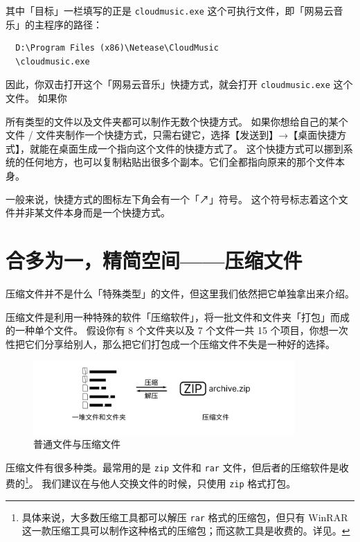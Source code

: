 其中「目标」一栏填写的正是 \verb|cloudmusic.exe| 这个可执行文件，即「网易云音乐」的主程序的路径：

\begin{verbatim}
  D:\Program Files (x86)\Netease\CloudMusic
  \cloudmusic.exe
\end{verbatim}

因此，你双击打开这个「网易云音乐」快捷方式，就会打开 \verb|cloudmusic.exe| 这个文件。
如果你


所有类型的文件以及文件夹都可以制作无数个快捷方式。
如果你想给自己的某个文件 / 文件夹制作一个快捷方式，只需右键它，选择【发送到】→【桌面快捷方式】，就能在桌面生成一个指向这个文件的快捷方式了。
这个快捷方式可以挪到系统的任何地方，也可以复制粘贴出很多个副本。它们全都指向原来的那个文件本身。

一般来说，快捷方式的图标左下角会有一个「↗」符号。
这个符号标志着这个文件并非某文件本身而是一个快捷方式。

\section{合多为一，精简空间——压缩文件}

压缩文件并不是什么「特殊类型」的文件，但这里我们依然把它单独拿出来介绍。

压缩文件是利用一种特殊的软件「压缩软件」，将一批文件和文件夹「打包」而成的一种单个文件。
假设你有 8 个文件夹以及 7 个文件一共 15 个项目，你想一次性把它们分享给别人，那么把它们打包成一个压缩文件不失是一种好的选择。

\begin{figure}[htb!]
  \centering
  \includegraphics[width=10cm]{assets/Compress.png}
  \caption{普通文件与压缩文件}
  \label{Compress}
\end{figure}

压缩文件有很多种类。最常用的是 \verb|zip| 文件和 \verb|rar| 文件，但后者的压缩软件是收费的\footnote{具体来说，大多数压缩工具都可以解压 \texttt{rar} 格式的压缩包，但只有 WinRAR 这一款压缩工具可以制作这种格式的压缩包；而这款工具是收费的。详见。}。
我们建议在与他人交换文件的时候，只使用 \verb|zip| 格式打包。

